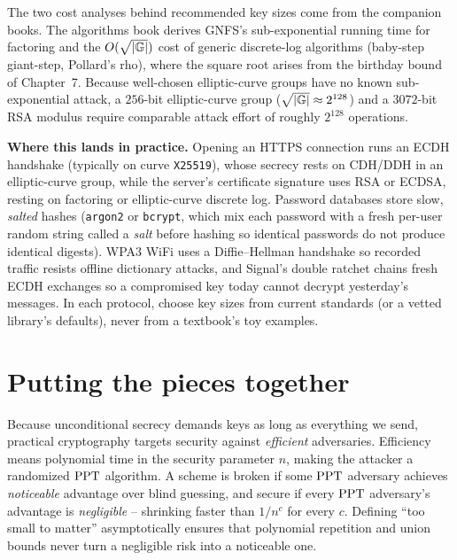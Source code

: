 \begin{connectionbox}
The two cost analyses behind recommended key sizes come from the companion books. The algorithms book derives GNFS's sub-exponential running time for factoring and the $O(\sqrt{|\mathbb{G}|})$ cost of generic discrete-log algorithms (baby-step giant-step, Pollard's rho), where the square root arises from the birthday bound of Chapter~7. Because well-chosen elliptic-curve groups have no known sub-exponential attack, a $256$-bit elliptic-curve group ($\sqrt{|\mathbb{G}|} \approx 2^{128}$) and a $3072$-bit RSA modulus require comparable attack effort of roughly $2^{128}$ operations.
\end{connectionbox}

\begin{applicationbox}
\textbf{Where this lands in practice.} Opening an HTTPS connection runs an ECDH handshake (typically on curve \texttt{X25519}), whose secrecy rests on CDH/DDH in an elliptic-curve group, while the server's certificate signature uses RSA or ECDSA, resting on factoring or elliptic-curve discrete log. Password databases store slow, \emph{salted} hashes (\texttt{argon2} or \texttt{bcrypt}, which mix each password with a fresh per-user random string called a \emph{salt} before hashing so identical passwords do not produce identical digests). WPA3 WiFi uses a Diffie--Hellman handshake so recorded traffic resists offline dictionary attacks, and Signal's double ratchet chains fresh ECDH exchanges so a compromised key today cannot decrypt yesterday's messages. In each protocol, choose key sizes from current standards (or a vetted library's defaults), never from a textbook's toy examples.
\end{applicationbox}

\section{Putting the pieces together}
\label{ch08:summary}

Because unconditional secrecy demands keys as long as everything we send, practical cryptography targets security against \emph{efficient} adversaries. Efficiency means polynomial time in the security parameter $n$, making the attacker a randomized $\mathrm{PPT}$ algorithm. A scheme is broken if some $\mathrm{PPT}$ adversary achieves \emph{noticeable} advantage over blind guessing, and secure if every $\mathrm{PPT}$ adversary's advantage is \emph{negligible} -- shrinking faster than $1/n^c$ for every $c$. Defining ``too small to matter'' asymptotically ensures that polynomial repetition and union bounds never turn a negligible risk into a noticeable one.


